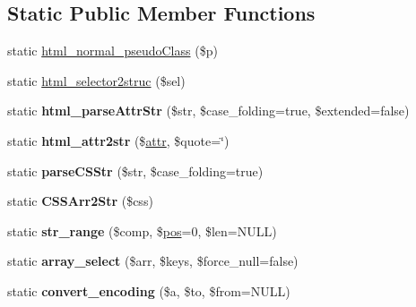 \subsection*{Static Public Member Functions}
\begin{DoxyCompactItemize}
\item 
static \mbox{\hyperlink{classduzun_1_1hQuery_1_1Node_a82f0739b0292cfb11570eeca08ac98c4}{html\+\_\+normal\+\_\+pseudo\+Class}} (\$p)
\item 
static \mbox{\hyperlink{classduzun_1_1hQuery_1_1Node_ac54f15080a896a8bad6bb21bddf56bac}{html\+\_\+selector2struc}} (\$sel)
\item 
\mbox{\label{classduzun_1_1hQuery_1_1Node_ae0795251fe089b36b6c85f0ccec61cf5}} 
static {\bfseries html\+\_\+parse\+Attr\+Str} (\$str, \$case\+\_\+folding=true, \$extended=false)
\item 
\mbox{\label{classduzun_1_1hQuery_1_1Node_a5ca45efa74a848a1e876191c1700246c}} 
static {\bfseries html\+\_\+attr2str} (\$\mbox{\hyperlink{classduzun_1_1hQuery_1_1Node_a530ab9e8edeb1e876b369dcb321208c0}{attr}}, \$quote=\textquotesingle{}\char`\"{}\textquotesingle{}) 
\item 
\mbox{\label{classduzun_1_1hQuery_1_1Node_a2cfdb22605901f90ca844b11d4d12a76}} 
static {\bfseries parse\+C\+S\+Str} (\$str, \$case\+\_\+folding=true)
\item 
\mbox{\label{classduzun_1_1hQuery_1_1Node_a2e1aa1fad388ee5e1e64f3bafcef245c}} 
static {\bfseries C\+S\+S\+Arr2\+Str} (\$css)
\item 
\mbox{\label{classduzun_1_1hQuery_1_1Node_a57e45a91ed7e2a08f99b0e6a4bb9333b}} 
static {\bfseries str\+\_\+range} (\$comp, \$\mbox{\hyperlink{classduzun_1_1hQuery_1_1Node_a781a7e7f2540c4787915407279683e6f}{pos}}=0, \$len=N\+U\+LL)
\item 
\mbox{\label{classduzun_1_1hQuery_1_1Node_a4c19fe444170bee7077b9bb05abf4bd1}} 
static {\bfseries array\+\_\+select} (\$arr, \$keys, \$force\+\_\+null=false)
\item 
\mbox{\label{classduzun_1_1hQuery_1_1Node_a85874b56f8ebd03b95766370af6d0b3b}} 
static {\bfseries convert\+\_\+encoding} (\$a, \$to, \$from=N\+U\+LL)
\end{DoxyCompactItemize}
